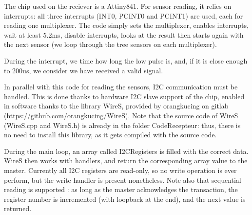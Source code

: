 \documentclass[a4paper,11pt]{article}
\begin{document}
\indent \par The chip used on the reciever is a Attiny841. For sensor reading, it relies on interrupts: all three interrupts (INT0, PCINT0 and PCINT1) are used, each for reading one multiplexer. The code simply sets the multiplexer, enables interrupts, wait at least 5.2ms, disable interrupts, looks at the result then starts again with the next sensor (we loop through the tree sensors on each multiplexer).
\par During the interrupt, we time how long the low pulse is, and, if it is close enough to 200us, we consider we have received a valid signal.
\par In parallel with this code for reading the sensors, I2C communication must be handled. This is done thanks to hardware I2C slave support of the chip, enabled in software thanks to the library WireS, provided by orangkucing on gitlab (https://github.com/orangkucing/WireS). Note that the source code of WireS (WireS.cpp and WireS.h) is already in the folder CodeRecepteur: thus, there is no need to install this library, as it gets compiled with the source code.
\par During the main loop, an array called I2CRegisters is filled with the correct data. WireS then works with handlers, and return the corresponding array value to the master. Currently all I2C registers are read-only, so no write operation is ever perform, but the write handler is present nonetheless. Note also that sequential reading is supported : as long as the master acknowledges the transaction, the register number is incremented (with loopback at the end), and the next value is returned.
\end{document}

